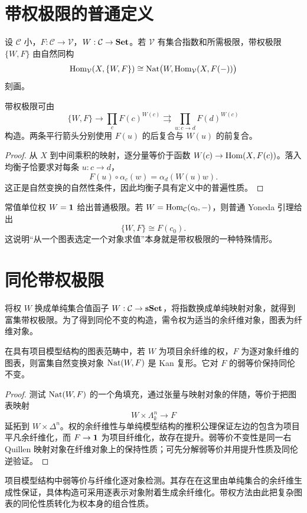 \section{带权极限的普通定义}
\begin{definition}[带权极限]
设 $\mathcal C$ 小，$F:\mathcal C\to\mathcal V$，$W:\mathcal C\to\mathbf{Set}$。若 $\mathcal V$ 有集合指数和所需极限，带权极限 $\{W,F\}$ 由自然同构
\[
\operatorname{Hom}_{\mathcal V}(X,\{W,F\})
\cong\operatorname{Nat}\bigl(W,\operatorname{Hom}_{\mathcal V}(X,F(-))\bigr)
\]
刻画。
\end{definition}
\begin{proposition}[均衡子公式]
带权极限可由
\[
\{W,F\}\longrightarrow\prod_cF(c)^{W(c)}
\rightrightarrows\prod_{u:c\to d}F(d)^{W(c)}
\]
构造。两条平行箭头分别使用 $F(u)$ 的后复合与 $W(u)$ 的前复合。
\end{proposition}
\begin{proof}
从 $X$ 到中间乘积的映射，逐分量等价于函数
$W(c)\to\operatorname{Hom}(X,F(c))$。落入均衡子恰要求对每条 $u:c\to d$，
\[
F(u)\circ\alpha_c(w)=\alpha_d(W(u)w).
\]
这正是自然变换的自然性条件，因此均衡子具有定义中的普遍性质。
\end{proof}
\begin{example}[普通极限与求值]
常值单位权 $W=\mathbf 1$ 给出普通极限。若 $W=\operatorname{Hom}_{\mathcal C}(c_0,-)$，则普通 Yoneda 引理给出
\[
\{W,F\}\cong F(c_0).
\]
这说明“从一个图表选定一个对象求值”本身就是带权极限的一种特殊情形。
\end{example}

\section{同伦带权极限}
\begin{definition}[单纯权]
将权 $W$ 换成单纯集合值函子 $W:\mathcal C\to\mathbf{sSet}$，将指数换成单纯映射对象，就得到富集带权极限。为了得到同伦不变的构造，需令权为适当的余纤维对象，图表为纤维对象。
\end{definition}
\begin{proposition}[提升检测]
在具有项目模型结构的图表范畴中，若 $W$ 为项目余纤维的权，$F$ 为逐对象纤维的图表，则富集自然变换对象 $\operatorname{Nat}(W,F)$ 是 Kan 复形。它对 $F$ 的弱等价保持同伦不变。
\end{proposition}
\begin{proof}
测试 $\operatorname{Nat}(W,F)$ 的一个角填充，通过张量与映射对象的伴随，等价于把图表映射
\[
W\times\Lambda_k^n\longrightarrow F
\]
延拓到 $W\times\Delta^n$。权的余纤维性与单纯模型结构的推积公理保证左边的包含为项目平凡余纤维化，而 $F\to\mathbf 1$ 为项目纤维化，故存在提升。弱等价不变性是同一右 Quillen 映射对象在纤维对象上的保持性质；可先分解弱等价并用提升性质及同伦逆验证。
\end{proof}
\begin{remark}
项目模型结构中弱等价与纤维化逐对象检测。其存在在这里由单纯集合的余纤维生成性保证，具体构造可采用逐表示对象附着生成余纤维化。带权方法由此把复杂图表的同伦性质转化为权本身的组合性质。
\end{remark}

